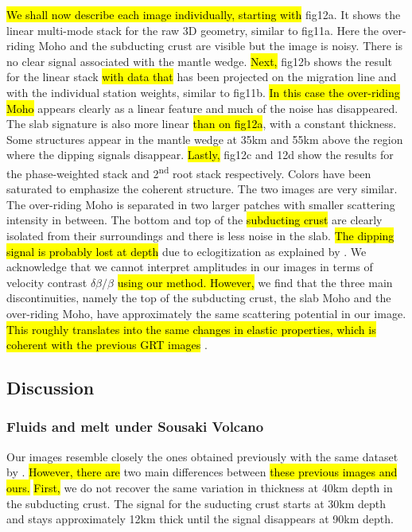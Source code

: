 \documentclass[10pt,a4paper]{article}
\begin{document}
\hl{We shall now describe each image individually, starting with} fig12a.
It shows the linear multi-mode stack for the raw 3D geometry, similar to fig11a.
Here the over-riding Moho and the subducting crust are visible but the image is noisy.
There is no clear signal associated with the mantle wedge.
\hl{Next,} fig12b shows the result for the linear stack \hl{with data that} has been projected on the migration line and with the individual station weights, similar to fig11b.
\hl{In this case the over-riding Moho} appears clearly as a linear feature and much of the noise has disappeared.
The slab signature is also more linear \hl{than on fig12a}, with a constant thickness.
Some structures appear in the mantle wedge at 35km and 55km above the region where the dipping signals disappear.
\hl{Lastly,} fig12c and 12d show the results for the phase-weighted stack and 2\textsuperscript{nd} root stack respectively.
Colors have been saturated to emphasize the coherent structure.
The two images are very similar.
The over-riding Moho is separated in two larger patches with smaller scattering intensity in between.
The bottom and top of the \hl{subducting crust} are clearly isolated from their surroundings and there is less noise in the slab.
\hl{The dipping signal is probably lost at depth} due to eclogitization as explained by \citet{pear_jgr_12}.
We acknowledge that we cannot interpret amplitudes in our images in terms of velocity contrast $\delta \beta / \beta$ \hl{using our method.
However,} we find that the three main discontinuities, namely the top of the subducting crust, the slab Moho and the over-riding Moho, have approximately the same scattering potential in our image.
\hl{This roughly translates into the same changes in elastic properties, which is coherent with the previous GRT images} \citep{pear_jgr_12}.

\subsection{Discussion}

\subsubsection{Fluids and melt under Sousaki Volcano}

Our images resemble closely the ones obtained previously with the same dataset by \citet{pear_jgr_12}.
\hl{However, there are} two main differences between \hl{these previous images and ours.}
\hl{First,} we do not recover the same variation in thickness at 40km depth in the subducting crust.
The signal for the suducting crust starts at 30km depth and stays approximately 12km thick until the signal disappears at 90km depth.
\end{document}

